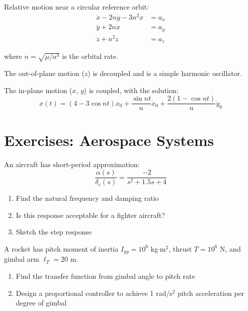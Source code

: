 Relative motion near a circular reference orbit:
\begin{align}
\ddot{x} - 2n\dot{y} - 3n^2 x &= a_x \\
\ddot{y} + 2n\dot{x} &= a_y \\
\ddot{z} + n^2 z &= a_z
\end{align}

where $n = \sqrt{\mu/a^3}$ is the orbital rate.

The out-of-plane motion ($z$) is decoupled and is a simple harmonic oscillator.

The in-plane motion ($x$, $y$) is coupled, with the solution:
\begin{equation}
x(t) = (4 - 3\cos nt)x_0 + \frac{\sin nt}{n}\dot{x}_0 + \frac{2(1-\cos nt)}{n}\dot{y}_0
\end{equation}

\section{Exercises: Aerospace Systems}

\begin{exercise}
An aircraft has short-period approximation:
\begin{equation}
\frac{\alpha(s)}{\delta_e(s)} = \frac{-2}{s^2 + 1.5s + 4}
\end{equation}
\begin{enumerate}[label=(\alph*)]
    \item Find the natural frequency and damping ratio
    \item Is this response acceptable for a fighter aircraft?
    \item Sketch the step response
\end{enumerate}
\end{exercise}

\begin{exercise}
A rocket has pitch moment of inertia $I_{yy} = 10^6$ kg$\cdot$m$^2$, thrust $T = 10^6$ N, and gimbal arm $\ell_T = 20$ m.
\begin{enumerate}[label=(\alph*)]
    \item Find the transfer function from gimbal angle to pitch rate
    \item Design a proportional controller to achieve 1 rad/s$^2$ pitch acceleration per degree of gimbal
\end{enumerate}
\end{exercise}

